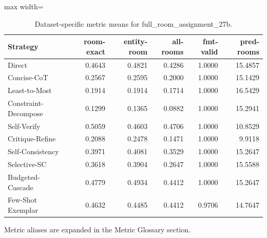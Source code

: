 \documentclass[10pt,twocolumn]{article}
\begin{document}
\begin{table}[t]
\centering
\caption{Dataset-specific metric means for full\_room\_assignment\_27b.}
\label{tab:full_room_assignment_27b_dataset}
\begin{adjustbox}{max width=\textwidth}
\begin{tabular}{lrrrrr}
\toprule
Strategy & room-exact & entity-room & all-rooms & fmt-valid & pred-rooms \\
\midrule
Direct & 0.4643 & 0.4821 & 0.4286 & 1.0000 & 15.4857 \\
Concise-CoT & 0.2567 & 0.2595 & 0.2000 & 1.0000 & 15.1429 \\
Least-to-Most & 0.1914 & 0.1914 & 0.1714 & 1.0000 & 16.5429 \\
Constraint-Decompose & 0.1299 & 0.1365 & 0.0882 & 1.0000 & 15.2941 \\
Self-Verify & 0.5059 & 0.4603 & 0.4706 & 1.0000 & 10.8529 \\
Critique-Refine & 0.2088 & 0.2478 & 0.1471 & 1.0000 & 9.9118 \\
Self-Consistency & 0.3971 & 0.4081 & 0.3529 & 1.0000 & 15.2647 \\
Selective-SC & 0.3618 & 0.3904 & 0.2647 & 1.0000 & 15.5588 \\
Budgeted-Cascade & 0.4779 & 0.4934 & 0.4412 & 1.0000 & 15.2647 \\
Few-Shot Exemplar & 0.4632 & 0.4485 & 0.4412 & 0.9706 & 14.7647 \\
\bottomrule
\end{tabular}
\end{adjustbox}
\vspace{2pt}\parbox{0.98\textwidth}{\footnotesize Metric aliases are expanded in the Metric Glossary section.}
\end{table}
\end{document}
